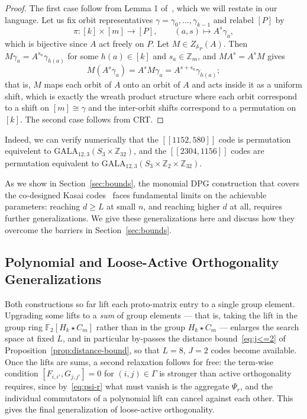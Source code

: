 \begin{proof}
The first case follow from Lemma 1 of~\cite{zhao2026ultrahighratequantumerrorcorrection}, which we will restate in our language. Let us fix orbit representatives $\gamma = \gamma_0,\dots,\gamma_{k-1}$ and relabel $[P]$ by
\[
    \pi : [k]\times[m]\to[P],\qquad (a,s)\mapsto A^s\gamma_a ,
\]
which is bijective since $A$ act freely on $P$. Let $M\in Z_{\mathbb A_P}(A)$. Then $M\gamma_a = A^{s_a}\gamma_{h(a)}$ for some $h(a)\in[k]$ and $s_a\in\mathbb Z_m$, and $MA^s = A^sM$ gives
\[
    M(A^s\gamma_a) = A^sM\gamma_a = A^{s+s_a}\gamma_{h(a)};
\]
that is, $M$ maps each orbit of $A$ onto an orbit of $A$ and acts inside it as a uniform shift, which is exactly the wreath product structure where each orbit correspond to a shift on $[m]\cong \gamma$ and the inter-orbit shifts correspond to a permutation on $[k]$. The second case follows from CRT.

\end{proof}


Indeed, we can verify numerically that the $[[1152,580]]$ code is permutation equivelent to $\mathrm{GALA}_{12,3}(S_3\times \mathbb Z_{32}) $, and the $[[2304,1156]]$ codes are permutation equivalent to $\mathrm{GALA}_{12,3}(S_3\times\mathbb Z_2\times  \mathbb Z_{32})$.

As we show in Section~\ref{sec:bounds}, the monomial DPG construction that covers the co-designed Kasai codes~\cite{zhao2026ultrahighratequantumerrorcorrection} faces fundamental limits on the achievable parameters: reaching $d\geq L$ at small $n$, and reaching higher $d$ at all, requires further generalizations. We give these generalizations here and discuss how they overcome the barriers in Section~\ref{sec:bounds}.

\subsection{Polynomial and Loose-Active Orthogonality Generalizations}\label{ssec:generalized-gala}

Both constructions so far lift each proto-matrix entry to a single group element. Upgrading some lifts to a \emph{sum} of group elements --- that is, taking the lift in the group ring $\mathbb F_2[H_k\star C_m]$ rather than in the group $H_k\star C_m$ --- enlarges the search space at fixed $L$, and in particular by-passes the distance bound~\eqref{eq:j<=2} of Proposition~\ref{prop:distance-bound}, so that $L = 8$, $J = 2$ codes become available. Once the lifts are sums, a second relaxation follows for free: the term-wise condition $[F_{i,i'},G_{j,j'}] = 0$ for $(i,j)\in\Gamma$ is stronger than active orthogonality requires, since by~\eqref{eq:psi-r} what must vanish is the aggregate $\Psi_r$, and the individual commutators of a polynomial lift can cancel against each other. This gives the final generalization of loose-active orthogonality.


